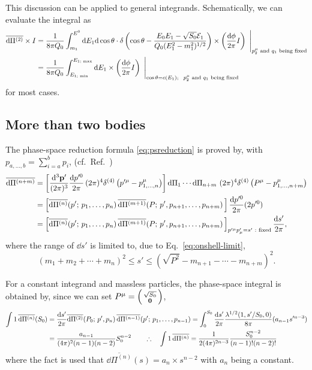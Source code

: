 \documentclass[CheatSheet]{subfiles}
\begin{document}
This discussion can be applied to general integrands. Schematically, we can evaluate the integral as
\begin{align}
 \overline{\dd\Pi^{(2)}}\times I
  &=\frac{1}{8\pi Q_0}
   \int_{m_1}^{E^0}{\dd E_1}{\dd\cos\theta}\cdot
  \diracdelta\left(\cos\theta-\frac{E_0E_1-\sqrt{S_0}\mathcal E_1}{Q_0(E_1^2-m_1^2)^{1/2}}\right)
  \times \left(\frac{\dd\phi}{2\pi} I\right)~\Bigg|_{\text{$p_2^\mu$ and $q_1$ being fixed}}
  \\
  &=\frac{1}{8\pi Q_0}
   \int_{E_{\text{1; min}}}^{E_{\text{1; max}}}{\dd E_1}
  \times \left(\frac{\dd\phi}{2\pi} I\right)~\Bigg|_{\cos\theta=c(E_1);~~\text{$p_2^\mu$ and $q_1$ being fixed}}
\label{eq:twobody-direct}
\end{align}
for most cases.




\subsection{More than two bodies}
The phase-space reduction formula \eqref{eq:psreduction} is proved by, with $p_{a,\dots,b}=\sum_{i=a}^b p_i$, (cf.~Ref.~\cite{Hitoshi233B})
\begin{align*}
  \overline{\dd\Pi^{(n+m)}}%
  &=\left[
    \ddP{p'}\frac{\dd p'^0}{2\pi}\tpdd[4]\left(p'^\mu-p_{1,\dots,n}^\mu\right)
  \right]
  \dd\Pi_1\cdots\dd\Pi_{n+m}\,\tpdd[4]\left(P^\mu-p_{1,\dots,n+m}^\mu\right)
\\ &=    \left[
    \overline{\dd\Pi^{(n)}}(p';\,p_1,\dots,p_n)\,
    \overline{\dd\Pi^{(m+1)}}(P;\,p',p_{n+1},\dots,p_{n+m})\,
  \right]
    \frac{\dd p'^0}{2\pi}(2p'^0)
\\ &=    \left[
    \overline{\dd\Pi^{(n)}}(p';\,p_1,\dots,p_n)\,
    \overline{\dd\Pi^{(m+1)}}(P;\,p',p_{n+1},\dots,p_{n+m})\,
  \right]_{p'^\mu p'_\mu=s'\text{~:~fixed}}
    \frac{\dd s'}{2\pi},
\end{align*}
where the range of $\dd s'$ is limited to, due to Eq.~\eqref{eq:onshell-limit},
\[
(m_1+m_2+\cdots+m_n)^2\le s'\le (\sqrt{P^2}-m_{n+1}-\cdots-m_{n+m})^2.
\]


For a constant integrand and massless particles, the phase-space integral is obtained by, since we can set $P^\mu=\left(\begin{smallmatrix}\sqrt{S_0}\\{\mathbf{0}}\end{smallmatrix}\right)$,
\begin{align}
\int1\,\overline{\dd\Pi^{(n)}}(S_0)
&= \frac{\dd s'}{2\pi}
  \overline{\dd\Pi^{(2)}}(P_0;\,p',p_{n})\,
  \overline{\dd\Pi^{(n-1)}}(p';\,p_1,\dots,p_{n-1})
= \int_0^{S_0}\frac{\dd s'}{2\pi}
\frac{\Kallen[1/2](1,s'/S_0,0)}{8\pi}
  (a_{n-1}s'^{n-3})
\notag\\&
= \frac{a_{n-1}}{(4\pi)^2(n-1)(n-2)}S_0^{n-2}
\qquad\therefore\quad
\int1\,\overline{\dd\Pi^{(n)}}=
  \frac{1}{2(4\pi)^{2n-3}}\frac{S_0^{n-2}}{(n-1)!(n-2)!}
\end{align}
where the fact is used that $\overline{\dd\Pi^{(n)}}(s)=a_n\times s^{n-2}$ with $a_n$ being a constant.
\end{document}
